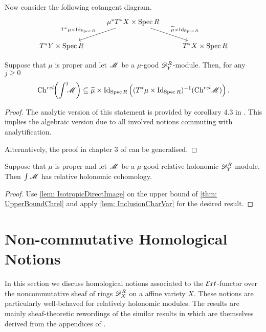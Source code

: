   Now consider the following cotangent diagram.
  $$
  \begin{tikzcd}
      & \mu^* T^* X\times \Spec R\arrow[swap]{ld}{T^* \mu \times \operatorname{Id}_{\Spec R}} \arrow{rd}{\widetilde{\mu}\times \operatorname{Id}_{\Spec R}} & \\
      T^* Y \times \Spec R& & T^*X\times \Spec R
  \end{tikzcd}
  $$
  \begin{theorem}\label{thm: UpperBoundChrel}
    Suppose that $\mu$ is proper and let $\mathscr{M}$ be a $\mu$-good $\mathscr{D}_Y^R$-module. Then, for any $j\geq 0$
    $$\operatorname{Ch}^{rel}\mkern-5mu\left(\int^j \mkern -8mu \mathscr{M} \right)\subseteq  \widetilde{\mu}\times \operatorname{Id}_{\operatorname{Spec} R}\left((T^*\mu \times \operatorname{Id}_{\operatorname{Spec} R})^{-1}(\operatorname{Ch}^{rel}\mkern-5mu \mathscr{M}) \right).$$
  \end{theorem}
  \begin{proof}
    The analytic version of this statement is provided by corollary 4.3 in \cite{schapira1994index}.
    This implies the algebraic version due to all involved notions commuting with analytification.

    Alternatively, the proof in chapter 3 of \cite{sabbah2011introduction} can be generalised.
  \end{proof}
  \begin{theorem}\label{thm: RelHolConserved}
      Suppose that $\mu$ is proper and let $\mathscr{M}$ be a $\mu$-good relative holonomic $\mathscr{D}_Y^R$-module. Then $\int \mathscr{M}$ has relative holonomic cohomology.
  \end{theorem}
  \begin{proof}
    Use \cref{lem: IsotropicDirectImage} on the upper bound of \cref{thm: UpperBoundChrel} and apply \cref{lem: InclusionCharVar} for the desired result.
  \end{proof}
\section{Non-commutative Homological Notions}\label{sec: NonComHomological}
In this section we discuss homological notions associated to the $\mathcal{E}\mkern -1mu xt$-functor over the noncommutative sheaf of rings $\mathscr{D}_X^R$ on a affine variety $X$.
These notions are particularly well-behaved for relatively holonomic modules.
The results are mainly sheaf-theoretic rewordings of the similar results in \cite{budur2019zero} which are themselves derived from the appendices of \cite{bjork1993analytic}.
